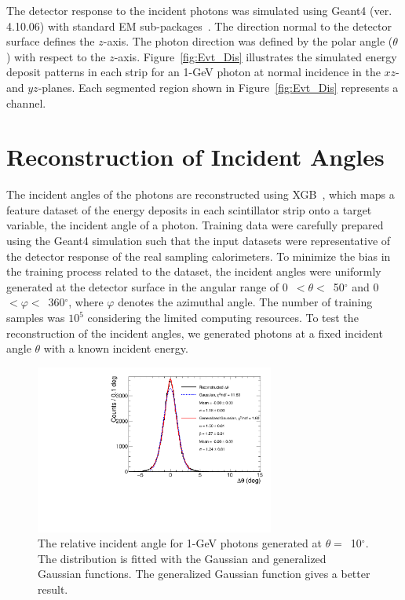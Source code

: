 \documentclass[preprint,12pt,times,a4paper]{elsarticle}
\begin{document}
The detector response to the incident photons was simulated using Geant4 (ver. 4.10.06) with standard EM sub-packages~\cite{GEANT4}. The direction normal to the detector surface defines the $z$-axis. The photon direction was defined by the polar angle ($\theta$) with respect to the $z$-axis. Figure~\ref{fig:Evt_Dis} illustrates the simulated energy deposit patterns in each strip for an 1-GeV photon at normal incidence in the $xz$- and $yz$-planes. Each segmented region shown in Figure~\ref{fig:Evt_Dis} represents a channel.

\section{Reconstruction of Incident Angles}
\label{sec:res}

The incident angles of the photons are reconstructed using XGB~\cite{xgboost:2016}, which maps a feature dataset of the energy deposits in each scintillator strip onto a target variable, the incident angle of a photon. Training data were carefully prepared using the Geant4 simulation such that the input datasets were representative of the detector response of the real sampling calorimeters. To minimize the bias in the training process related to the dataset, the incident angles were uniformly generated at the detector surface in the angular range of 0~$<\theta<$~50$^{\circ}$ and 0~$<\varphi<$~360$^{\circ}$, where $\varphi$ denotes the azimuthal angle. The number of training samples was $10^{5}$ considering the limited computing resources. To test the reconstruction of the incident angles, we generated photons at a fixed incident angle $\theta$ with a known incident energy.

\begin{figure}[!hbt]
\centering
\includegraphics[width=0.7\textwidth]{Fig3_fit_GG.pdf}
\caption{ The relative incident angle for 1-GeV photons generated at $\theta=$~10$^{\circ}$. The distribution is fitted with the Gaussian and generalized Gaussian functions. The generalized Gaussian function gives a better result.}
\label{fig:angle_10degree}
\end{figure}
\end{document}
